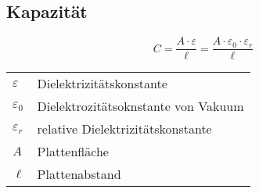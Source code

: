 



\subsection{Kapazität}
\[ C = \frac{A \cdot \varepsilon}{\ell} 
= \frac{A \cdot \varepsilon_0 \cdot \varepsilon_r}{\ell} \]
\begin{tabular}{lp{}}
$\varepsilon$&Dielektrizitätskonstante\\
$\varepsilon_0$&Dielektrozitätsoknstante von Vakuum\\
$\varepsilon_r$&relative Dielektrizitätskonstante\\
$A$&Plattenfläche\\
$\ell$&Plattenabstand
\end{tabular}
